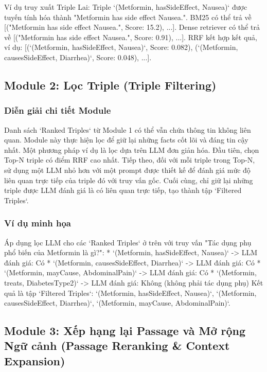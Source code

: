 \documentclass{article}
\begin{document}
Ví dụ truy xuất Triple Lai: Triple `(Metformin, hasSideEffect, Nausea)` được tuyến tính hóa thành "Metformin has side effect Nausea.". BM25 có thể trả về [("Metformin has side effect Nausea.", Score: 15.2), ...]. Dense retriever có thể trả về [("Metformin has side effect Nausea.", Score: 0.91), ...]. RRF kết hợp kết quả, ví dụ: [(`(Metformin, hasSideEffect, Nausea)`, Score: 0.082), (`(Metformin, causesSideEffect, Diarrhea)`, Score: 0.048), ...].

\subsection{Module 2: Lọc Triple (Triple Filtering)}

\subsubsection{Diễn giải chi tiết Module}
Danh sách `Ranked Triples` từ Module 1 có thể vẫn chứa thông tin không liên quan. Module này thực hiện lọc để giữ lại những facts cốt lõi và đáng tin cậy nhất. Một phương pháp ví dụ là lọc dựa trên LLM đơn giản hóa. Đầu tiên, chọn Top-N triple có điểm RRF cao nhất. Tiếp theo, đối với mỗi triple trong Top-N, sử dụng một LLM nhỏ hơn với một prompt được thiết kế để đánh giá mức độ liên quan trực tiếp của triple đó với truy vấn gốc. Cuối cùng, chỉ giữ lại những triple được LLM đánh giá là có liên quan trực tiếp, tạo thành tập `Filtered Triples`.

\subsubsection{Ví dụ minh họa}
Áp dụng lọc LLM cho các `Ranked Triples` ở trên với truy vấn "Tác dụng phụ phổ biến của Metformin là gì?":
*   `(Metformin, hasSideEffect, Nausea)` -> LLM đánh giá: Có
*   `(Metformin, causesSideEffect, Diarrhea)` -> LLM đánh giá: Có
*   `(Metformin, mayCause, AbdominalPain)` -> LLM đánh giá: Có
*   `(Metformin, treats, DiabetesType2)` -> LLM đánh giá: Không (không phải tác dụng phụ)
Kết quả là tập `Filtered Triples`: {`(Metformin, hasSideEffect, Nausea)`, `(Metformin, causesSideEffect, Diarrhea)`, `(Metformin, mayCause, AbdominalPain)`}.

\subsection{Module 3: Xếp hạng lại Passage và Mở rộng Ngữ cảnh (Passage Reranking \& Context Expansion)}
\end{document}
